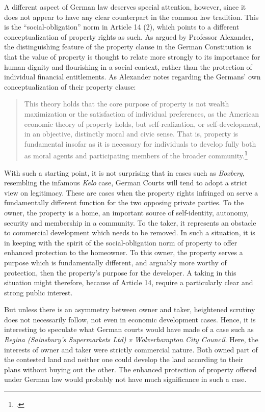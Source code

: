 A different aspect of German law deserves special attention, however, since it does not appear to have any clear counterpart in the common law tradition. This is the  ``social-obligation'' norm in Article 14 (2), which points to a different conceptualization of property rights as such. As argued by Professor Alexander, the distinguishing feature of the property clause in the German Constitution is that the value of property is thought to relate more strongly to its importance for human dignity and flourishing in a social context, rather than the protection of individual financial entitlements. As Alexander notes regarding the Germans' own conceptualization of their property clause:

\begin{quote}
This theory holds that the core purpose of property is not wealth maximization or the satisfaction of individual preferences, as the American economic theory of property holds, but self-realization, or self-development, in an objective, distinctly moral and civic sense. That is, property is fundamental insofar as it is necessary for individuals to develop fully both
as moral agents and participating members of the broader community.\footcite[745]{alexander03}
\end{quote}

With such a starting point, it is not surprising that in cases such as {\it Boxberg}, resembling the infamous {\it Kelo} case, German Courts will tend to adopt a strict view on legitimacy. These are cases when the property rights infringed on serve a fundamentally different function for the two opposing private parties. To the owner, the property is a home, an important source of self-identity, autonomy, security and membership in a community. To the taker, it represents an obstacle to commercial development which needs to be removed. In such a situation, it is in keeping with the spirit of the social-obligation norm of property to offer enhanced protection to the homeowner. To this owner, the property serves a purpose which is fundamentally different, and arguably more worthy of protection, then the property's purpose for the developer. A taking in this situation might therefore, because of Article 14, require a particularly clear and strong public interest.

But unless there is an asymmetry between owner and taker, heightened scrutiny does not necessarily follow, not even in economic development cases. Hence, it is interesting to speculate what German courts would have made of a case such as {\it Regina (Sainsbury’s Supermarkets Ltd) v Wolverhampton City Council}. Here, the interests of owner and taker were strictly commercial nature. Both owned part of the contested land and neither one could develop the land according to their plans without buying out the other. The enhanced protection of property offered under German law would probably not have much significance in such a case. 

